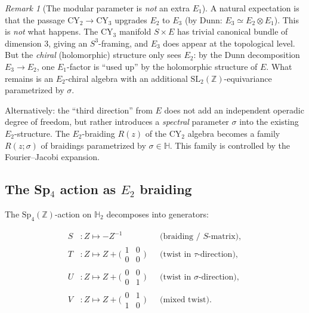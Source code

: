 \documentclass[11pt]{article}
\theoremstyle{plain}
\theoremstyle{definition}
\theoremstyle{remark}
\newtheorem{remark}[theorem]{Remark}
\newcommand{\CY}{\mathrm{CY}}
\newcommand{\Eone}{E_1}
\newcommand{\Etwo}{E_2}
\begin{document}
\begin{remark}[The modular parameter is \emph{not} an extra $\Eone$]
\label{rmk:not-extra-e1}
A natural expectation is that the passage $\CY_2 \to \CY_3$ upgrades $\Etwo$ to
$E_3$ (by Dunn: $E_3 \simeq \Etwo \otimes \Eone$). This is \emph{not} what
happens. The $\CY_3$ manifold $S \times E$ has trivial canonical bundle of
dimension $3$, giving an $S^3$-framing, and $E_3$ does appear at the topological
level. But the \emph{chiral} (holomorphic) structure only sees $\Etwo$: by
the Dunn decomposition $E_3 \to \Etwo$, one $\Eone$-factor is ``used up'' by
the holomorphic structure of $E$. What remains is an $\Etwo$-chiral algebra
with an additional $\mathrm{SL}_2(\mathbb{Z})$-equivariance parametrized by
$\sigma$.

Alternatively: the ``third direction'' from $E$ does not add an independent
operadic degree of freedom, but rather introduces a \emph{spectral} parameter
$\sigma$ into the existing $\Etwo$-structure. The $\Etwo$-braiding $R(z)$ of
the $\CY_2$ algebra becomes a family $R(z; \sigma)$ of braidings parametrized
by $\sigma \in \mathbb{H}$. This family is controlled by the Fourier--Jacobi
expansion.
\end{remark}

\subsection{The Sp$_4$ action as $\Etwo$ braiding}
\label{subsec:sp4-e2}

The $\mathrm{Sp}_4(\mathbb{Z})$-action on $\mathbb{H}_2$ decomposes into
generators:

\begin{align}
 S &\colon Z \longmapsto -Z^{-1}
 &&\text{(braiding / $S$-matrix)}, \label{eq:sp4-S} \\
 T &\colon Z \longmapsto Z + \bigl(\begin{smallmatrix} 1 & 0 \\ 0 & 0 \end{smallmatrix}\bigr)
 &&\text{(twist in $\tau$-direction)}, \label{eq:sp4-T} \\
 U &\colon Z \longmapsto Z + \bigl(\begin{smallmatrix} 0 & 0 \\ 0 & 1 \end{smallmatrix}\bigr)
 &&\text{(twist in $\sigma$-direction)}, \label{eq:sp4-U} \\
 V &\colon Z \longmapsto Z + \bigl(\begin{smallmatrix} 0 & 1 \\ 1 & 0 \end{smallmatrix}\bigr)
 &&\text{(mixed twist)}. \label{eq:sp4-V}
\end{align}
\end{document}
